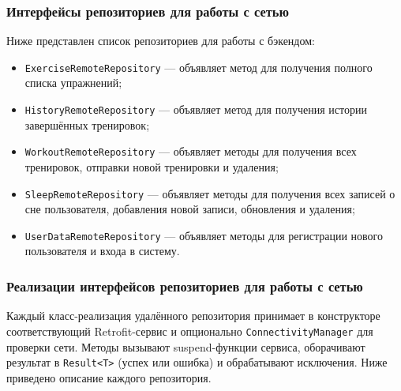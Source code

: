 \subsubsection{Интерфейсы репозиториев для работы с сетью}

Ниже представлен список репозиториев для работы с бэкендом:
\begin{itemize}
    \item \texttt{ExerciseRemoteRepository} — объявляет метод для получения полного списка упражнений;
    \item \texttt{HistoryRemoteRepository} — объявляет метод для получения истории завершённых тренировок;
    \item \texttt{WorkoutRemoteRepository} — объявляет методы для получения всех тренировок, отправки новой тренировки и удаления;
    \item \texttt{SleepRemoteRepository} — объявляет методы для получения всех записей о сне пользователя, добавления новой записи, обновления и удаления;
    \item \texttt{UserDataRemoteRepository} — объявляет методы для регистрации нового пользователя и входа в систему.
\end{itemize}

\subsubsection{Реализации интерфейсов репозиториев для работы с сетью}

Каждый класс-реализация удалённого репозитория принимает в конструкторе соответствующий Retrofit-сервис и опционально \texttt{ConnectivityManager} для проверки сети. Методы вызывают suspend-функции сервиса, оборачивают результат в \texttt{Result<T>} (успех или ошибка) и обрабатывают исключения. Ниже приведено описание каждого репозитория.

